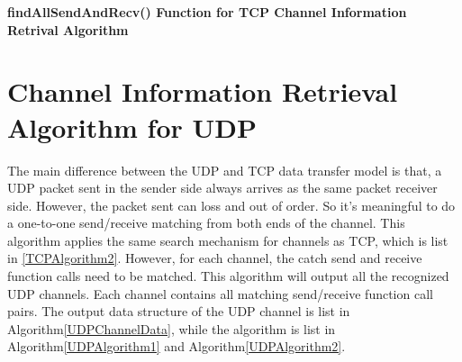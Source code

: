 \begin{algorithm}[H]
\DontPrintSemicolon
\caption{{\bf findAllSendAndRecv() Function for TCP Channel Information Retrival Algorithm}\label{TCPAlgorithm3}}
\end{algorithm}

\section{Channel Information Retrieval Algorithm for UDP}
The main difference between the UDP and TCP data transfer model is that, a UDP packet sent in the sender side always arrives as the same packet receiver side. However, the packet sent can loss and out of order. So it's meaningful to do a one-to-one send/receive matching from both ends of the channel. This algorithm applies the same search mechanism for channels as TCP, which is list in \ref{TCPAlgorithm2}. However, for each channel, the catch send and receive function calls need to be matched. This algorithm will output all the recognized UDP channels. Each channel contains all matching send/receive function call pairs. The output data structure of the UDP channel is list in Algorithm\ref{UDPChannelData}, while the algorithm is list in Algorithm\ref{UDPAlgorithm1} and Algorithm\ref{UDPAlgorithm2}.

